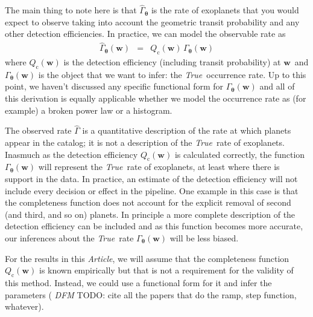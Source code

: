 \documentclass[12pt,preprint]{aastex}
\newcommand{\paper}{\textsl{Article}}
\newcommand{\foreign}[1]{\emph{#1}}
\newcommand{\True}{\foreign{True}}
\newcommand{\eqlabel}[1]{\label{eq:#1}}
\newcommand{\bvec}[1]{\ensuremath{\boldsymbol{#1}}}
\newcommand{\todo}[3]{{\color{#2} \emph{#1} TODO: #3}}
\newcommand{\dfmtodo}[1]{\todo{DFM}{red}{#1}}
\newcommand{\rate}{\ensuremath{\Gamma}}
\newcommand{\ratepar}{{\ensuremath{\theta}}}
\newcommand{\ratepars}{{\ensuremath{\bvec{\ratepar}}}}
\newcommand{\obs}[1]{\ensuremath{\hat{#1}}}
\newcommand{\completeness}{{\ensuremath{Q_\mathrm{c}}}}
\newcommand{\entry}{{\ensuremath{\bvec{w}}}}
\begin{document}
The main thing to note here is that $\obs{\rate}_\ratepars$ is the rate of
exoplanets that you would expect to observe taking into account the geometric
transit probability and any other detection efficiencies.
In practice, we can model the observable rate as
\begin{eqnarray}\eqlabel{obs-rate}
\obs{\rate}_\ratepars(\entry) &=&
    \completeness(\entry)\,\rate_\ratepars(\entry)
\end{eqnarray}
where $\completeness(\entry)$ is the detection efficiency (including transit
probability) at \entry\ and $\rate_\ratepars(\entry)$ is the object that we
want to infer: the \True\ occurrence rate.
Up to this point, we haven't discussed any specific functional form for
$\rate_\ratepars(\entry)$ and all of this derivation is equally applicable
whether we model the occurrence rate as (for example) a broken power law or
a histogram.

The observed rate \obs{\rate} is a quantitative description of the rate at
which planets appear in the \citet{petigura} catalog; it is not a description
of the \True\ rate of exoplanets.
Inasmuch as the detection efficiency $\completeness(\entry)$ is calculated
correctly, the function $\rate_\ratepars(\entry)$ will represent the \True\
rate of exoplanets, at least where there is support in the data.
In practice, an estimate of the detection efficiency will not include every
decision or effect in the pipeline.
One example in this case is that the completeness function does not account
for the explicit removal of second (and third, and so on) planets.
In principle a more complete description of the detection efficiency can be
included and as this function becomes more accurate, our inferences about the
\True\ rate $\rate_\ratepars(\entry)$ will be less biased.

For the results in this \paper, we will assume that the completeness function
$\completeness(\entry)$ is known empirically but that is not a requirement for
the validity of this method.
Instead, we could use a functional form for it and infer the parameters
(\dfmtodo{cite all the papers that do the ramp, step function, whatever}).
\end{document}
